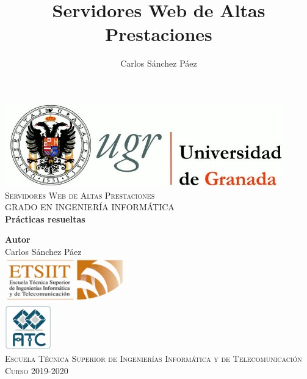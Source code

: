 \documentclass[12pt,spanish]{article}
\title{Servidores Web de Altas Prestaciones}
\author{Carlos Sánchez Páez}
\begin{document}
\lstset{columns=fullflexible,basicstyle=\ttfamily}


\begin{titlepage}

 \newlength{\centeroffset}
 \setlength{\centeroffset}{-0.5\oddsidemargin}
 \addtolength{\centeroffset}{0.5\evensidemargin}
 \thispagestyle{empty}

 \noindent\hspace*{\centeroffset}
 \begin{minipage}{\textwidth}

  \centering
  \includegraphics[width=0.9\textwidth]{logo_ugr.jpg}\\[1.4cm]

  \textsc{ \Large Servidores Web de Altas Prestaciones\\[0.2cm]}
  \textsc{GRADO EN INGENIERÍA INFORMÁTICA}\\[1cm]

  {\Huge\bfseries Prácticas resueltas \\}
 \end{minipage}

 \vspace{1.5cm}
 \noindent\hspace*{\centeroffset}
 \begin{minipage}{\textwidth}
  \centering

  \textbf{Autor}\\ {Carlos Sánchez Páez}\\[2.5ex]
  \includegraphics[width=0.4\textwidth]{etsiit_logo.png}\\[0.1cm]
  \vspace{1.5cm}
  \includegraphics[width=0.15\textwidth]{atc.jpg}\\[0.1cm]
  \vspace{1cm}
  \textsc{Escuela Técnica Superior de Ingenierías Informática y de Telecomunicación}\\
  \vspace{1cm}
  \textsc{Curso 2019-2020}
 \end{minipage}
\end{titlepage}
\thispagestyle{empty}
\newpage
\tableofcontents{}
\newpage
\end{document}
